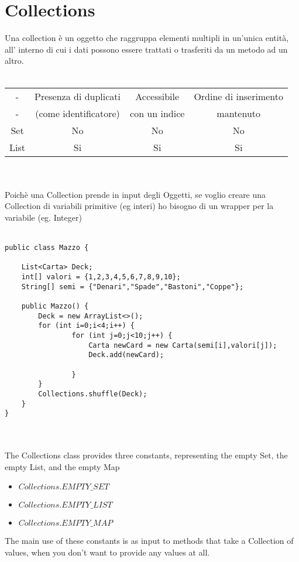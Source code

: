\documentclass[10pt,a4paper]{article}
\begin{document}
\section{Collections}
Una collection è un oggetto che raggruppa elementi multipli in un'unica entità, all' interno di cui i dati possono essere trattati o trasferiti da un metodo ad un altro.\\\\
\begin{tabular}{|c|c|c|c|}
\hline 
- & Presenza di duplicati  & Accessibile  & Ordine di inserimento\\
- & (come identificatore) & con un indice & mantenuto \\
\hline 
Set & No & No & No \\ 
\hline 
List & Si & Si & Si \\ 
\hline 
\end{tabular} 
\\\\
Poichè una Collection prende in input degli Oggetti, se voglio creare una Collection di variabili primitive (eg interi) ho bisogno di un wrapper per la variabile (eg. Integer)\\\\
\begin{verbatim}
public class Mazzo {
    
    List<Carta> Deck;
    int[] valori = {1,2,3,4,5,6,7,8,9,10};
    String[] semi = {"Denari","Spade","Bastoni","Coppe"};
    
    public Mazzo() {
        Deck = new ArrayList<>();
        for (int i=0;i<4;i++) {
                for (int j=0;j<10;j++) {
                    Carta newCard = new Carta(semi[i],valori[j]);
                    Deck.add(newCard);
                    
                }
        }
        Collections.shuffle(Deck);
    }
}

\end{verbatim}
\\\\
The Collections class provides three constants, representing the empty Set, the empty List, and the 
empty Map 
\begin{itemize}
\item $Collections.EMPTY\_SET $
\item $Collections.EMPTY\_LIST $
\item $Collections.EMPTY\_MAP $
\end{itemize}
The main use of these constants is as input to methods that take a Collection of values, when you 
don't want to provide any values at all. 
\end{document}
